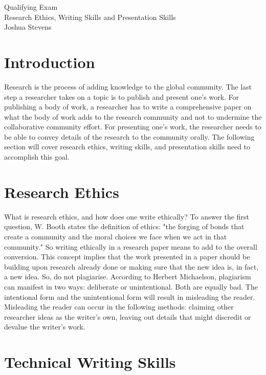 \documentclass[12pt]{article}
\begin{document}
\begin{center}
{\Large Qualifying Exam} \\[.1in]
{\large Research Ethics, Writing Skills and Presentation Skills} \\[.1in]
{\large Joshua Stevens}
\end{center}


\section{Introduction}

Research is the process of adding knowledge to the global community. The last step a researcher takes on a topic is to publish and present one's work.  For publishing a body of work, a researcher has to write a comprehensive paper on what the body of work adds to the research community and not to undermine the collaborative community effort. For presenting one's work, the researcher needs to be able to convey details of the research to the community orally. The following section will cover research ethics, writing skills, and presentation skills need to accomplish this goal.

\section{Research Ethics}

What is research ethics, and how does one write ethically? To answer the first question, W. Booth states the definition of ethics: "the forging of bonds that create a community and the moral choices we face when we act in that community.\cite{Booth}"  So writing ethically in a research paper means to add to the overall conversion. This concept implies that the work presented in a paper should be building upon research already done or making sure that the new idea is, in fact, a new idea. So, do not plagiarise\cite{Michaelson}. According to Herbert Michaelson, plagiarism can manifest in two ways: deliberate or unintentional\cite{Michaelson}. Both are equally bad.  The intentional form and the unintentional form will result in misleading the reader. Misleading the reader can occur in the following methods: claiming other researcher ideas as the writer's own, leaving out details that might discredit or devalue the writer's work\cite{Michaelson}.        



\section{Technical Writing Skills}
\end{document}

